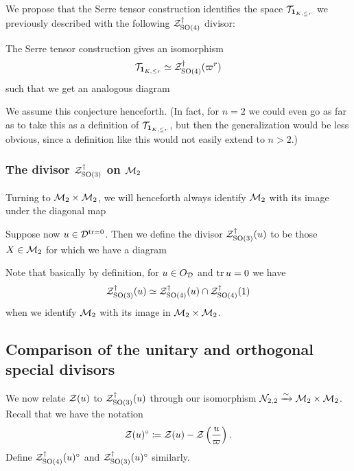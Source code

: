 We propose that the Serre tensor construction identifies
the space $\mathcal{T}_{\mathbf{1}_{K, \le r}}$ we previously described with the following $\mathcal Z^{\dagger}_{\operatorname{SO}(4)}$ divisor:
\begin{conjecture}
  \label{conj:serre_pullback_space}
  The Serre tensor construction gives an isomorphism
  \[ \mathcal{T}_{\mathbf{1}_{K, \le r}} \simeq \mathcal Z^{\dagger}_{\operatorname{SO}(4)}(\varpi^r) \]
  such that we get an analogous diagram
  \begin{center}
  \end{center}
\end{conjecture}
We assume this conjecture henceforth.
(In fact, for $n = 2$ we could even go as far as to take this as a definition of $\mathcal{T}_{\mathbf{1}_{K, \le r}}$,
but then the generalization  would be less obvious,
since a definition like this would not easily extend to $n > 2$.)

\subsubsection{The divisor $\mathcal Z^{\dagger}_{\operatorname{SO}(3)}$ on $\mathcal M_2$}
Turning to $\mathcal M_2 \times \mathcal M_2$, we will henceforth always identify $\mathcal M_2$
with its image under the diagonal map
\begin{center}
\end{center}

\begin{definition}
  [$\ZO3(u)$]
  Suppose now $u \in \mathcal D^{\operatorname{tr} = 0}$.
  Then we define the divisor $\ZO3(u)$ to be those $X \in \mathcal M_2$
  for which we have a diagram
  \begin{center}
  \end{center}
  Note that basically by definition, for $u \in O_\mathcal D$ and $\operatorname{tr} u = 0$ we have
  \[ \mathcal Z^{\dagger}_{\operatorname{SO}(3)}(u) \simeq \mathcal Z^{\dagger}_{\operatorname{SO}(4)}(u) \cap \mathcal Z^{\dagger}_{\operatorname{SO}(4)}(1) \]
  when we identify $\mathcal M_2$ with its image in $\mathcal M_2 \times \mathcal M_2$.
\end{definition}

\subsection{Comparison of the unitary and orthogonal special divisors}
We now relate $\mathcal Z(u)$ to $\ZO3(u)$ through our
isomorphism $\mathcal N_{2,2} \xrightarrow{\sim} \mathcal M_2 \times \mathcal M_2$.
Recall that we have the notation
\[ \mathcal Z(u)^\circ \coloneqq \mathcal Z(u) - \mathcal Z\left( \frac{u}{\varpi} \right). \]
Define $\mathcal Z^{\dagger}_{\operatorname{SO}(4)}(u)^\circ$ and $\mathcal Z^{\dagger}_{\operatorname{SO}(3)}(u)^\circ$ similarly.

